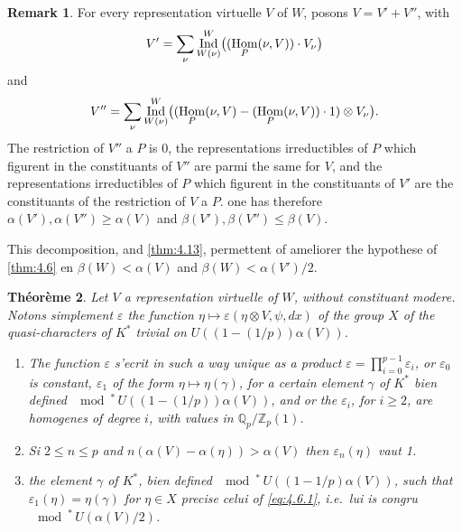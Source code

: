 \documentclass[12pt,a4paper]{article}
\theoremstyle{plain}
\newtheorem{theorem}{Th\'eor\`eme}[section]
\theoremstyle{definition}
\newtheorem{remark}[theorem]{Remark}
\theoremstyle{remark}
\DeclareMathOperator{\Ind}{Ind}
\DeclareMathOperator{\Hom}{Hom}
\newcommand{\bQ}{\mathbb{Q}}
\newcommand{\bZ}{\mathbb{Z}}
\let\dim\relax\let\det\relax
\providecommand{\Hom}{\operatorname{Hom}}
\begin{document}
\begin{remark}\label{rem:4.14}
For every representation virtuelle $V$ of $W$, posons $V = V' + V''$, with
\[
V' = \sum_\nu \Ind_{W(\nu)}^W\bigl((\dim \Hom_P(\nu, V)) \cdot V_\nu\bigr)
\]
and
\[
V'' = \sum_\nu \Ind_{W(\nu)}^W\bigl((\Hom_P(\nu, V) - (\dim \Hom_P(\nu, V)) \cdot 1) \otimes V_\nu\bigr).
\]
The restriction of $V''$ a $P$ is 0, the representations irreductibles of $P$ which figurent in the constituants of $V''$ are parmi the same for $V$, and the representations irreductibles of $P$ which figurent in the constituants of $V'$ are the constituants of the restriction of $V$ a $P$. one has therefore $\alpha(V'), \alpha(V'') \geq \alpha(V)$ and $\beta(V'), \beta(V'') \leq \beta(V)$.

This decomposition, and \ref{thm:4.13}, permettent of ameliorer the hypothese of \ref{thm:4.6} en $\beta(W) < \alpha(V)$ and $\beta(W) < \alpha(V')/2$.
\end{remark}

\begin{theorem}\label{thm:4.15}
Let $V$ a representation virtuelle of $W$, without constituant modere. Notons simplement $\varepsilon$ the function $\eta \mapsto \varepsilon(\eta \otimes V, \psi, dx)$ of the group $X$ of the quasi-characters of $K^*$ trivial on $U((1-(1/p))\alpha(V))$.
\begin{enumerate}[label=(\roman*)]
\item The function $\varepsilon$ s'ecrit in such a way unique as a product $\varepsilon = \prod_{i=0}^{p-1} \varepsilon_i$, or $\varepsilon_0$ is constant, $\varepsilon_1$ of the form $\eta \mapsto \eta(\gamma)$, for a certain element $\gamma$ of $K^*$ bien defined $\mod^*\, U((1-(1/p))\alpha(V))$, and or the $\varepsilon_i$, for $i \geq 2$, are homogenes of degree $i$, with values in $\bQ_p/\bZ_p(1)$.
\item Si $2 \leq n \leq p$ and $n(\alpha(V) - \alpha(\eta)) > \alpha(V)$ then $\varepsilon_n(\eta)$ vaut 1.
\item the element $\gamma$ of $K^*$, bien defined $\mod^*\, U((1-1/p)\alpha(V))$, such that $\varepsilon_1(\eta) = \eta(\gamma)$ for $\eta \in X$ precise celui of \eqref{eq:4.6.1}, i.e.~lui is congru $\mod^*\, U(\alpha(V)/2)$.
\end{enumerate}
\end{theorem}
\end{document}
